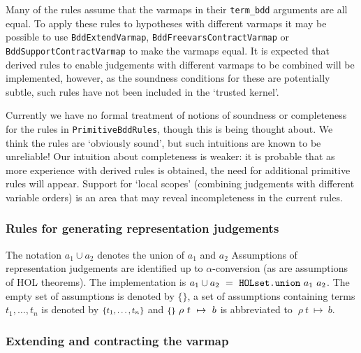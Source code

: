 \documentclass[12pt,fleqn]{book}
\renewcommand{\t}[1]{\mbox{\tt #1}}
\newcommand{\termbdd}[4]{\mbox{$#1~#2~#3~\mapsto~#4$}}
\newcommand{\emptyass}{\mbox{\footnotesize$\{{}\}$}{}}
\newcommand{\setass}[1]{\mbox{\footnotesize$\{#1\}$}{}}
\newcommand\termbddty{\texttt{term\_bdd}{}}
\begin{document}
Many of the rules assume that the varmaps in their \termbddty
arguments are all equal. To apply these rules to hypotheses with
different varmaps it may be possible to use \t{BddExtendVarmap},
\t{BddFreevarsContractVarmap} or \t{BddSupportContractVarmap} to make
the varmaps equal.  It is expected that derived rules to enable
judgements with different varmaps to be combined will be implemented,
however, as the soundness conditions for these are potentially subtle,
such rules have not been included in the `trusted kernel'.

Currently we have no formal treatment of notions of soundness or
completeness for the rules in \t{PrimitiveBddRules}, though this is
being thought about. We think the rules are `obviously sound', but
such intuitions are known to be unreliable! Our intuition about
completeness is weaker: it is probable that as more experience with
derived rules is obtained, the need for additional primitive rules
will appear. Support for `local scopes' (combining judgements with
different variable orders) is an area that may reveal incompleteness
in the current rules.

\subsubsection{Rules for generating representation judgements}\label{term-bdd-rules}

The notation $a_1 \cup a_2$ denotes the union of $a_1$ and $a_2$ 
Assumptions of
representation judgements are identified up to $\alpha$-conversion (as
are assumptions of HOL theorems).
The implementation is $a_1 \cup a_2~=~\t{HOLset.union}~a_1~a_2$. 
The empty set of assumptions is denoted by \emptyass, a set of
assumptions containing terms $t_1, \ldots ,t_n$ is denoted by
$\setass{t_1, \ldots ,t_n}$  and 
$\termbdd{\emptyass}{\rho}{t}{b}$ is abbreviated to
$\termbdd{}{\rho}{t}{b}$.


\subsubsection*{Extending and contracting the varmap}
\end{document}

